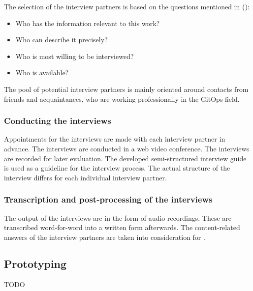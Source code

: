 The selection of the interview partners is based on the questions mentioned in
\citeauthor{glaser2010experteninterviews} (\citeyear{glaser2010experteninterviews}):

\begin{itemize}
	\item Who has the information relevant to this work?
	\item Who can describe it precisely?
	\item Who is most willing to be interviewed?
	\item Who is available?
\end{itemize}

The pool of potential interview partners is mainly oriented around
contacts from friends and acquaintances,
who are working professionally in the GitOps field.

\subsubsection{Conducting the interviews}

Appointments for the interviews are made with each interview partner in advance. 
The interviews are conducted in a web video conference.
The interviews are recorded for later evaluation.
The developed semi-structured interview guide
is used as a guideline for the interview process.
The actual structure of the interview differs for each individual interview partner.

\subsubsection{Transcription and post-processing of the interviews}

The output of the interviews are in the form of audio recordings.
These are transcribed word-for-word into a written form afterwards.
The content-related answers of the interview partners are taken into consideration
for .

\subsection{Prototyping}

TODO








